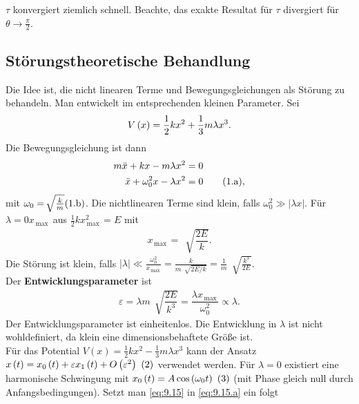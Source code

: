 \documentclass[a4paper,12pt]{article}
\newcommand\inlineeqno{\stepcounter{equation}\ {(\theequation)}}
\newcommand\inlineeqnob{(\theequation.\text{b})}
\newcommand\inlineeqnowoa{\theequation.\text{a}}
\numberwithin{equation}{section}
\begin{document}
$\tau $ konvergiert ziemlich schnell. Beachte, das exakte Resultat für $\tau $ divergiert für $\theta \rightarrow \tfrac{\pi }{2}$.

\subsection{Störungstheoretische Behandlung}
Die Idee ist, die nicht linearen Terme und Bewegungsgleichungen als Störung zu behandeln. Man entwickelt im entsprechenden kleinen Parameter. Sei
\begin{align} 
        V\left(x\right)=\dfrac{1}{2}kx^2+\dfrac{1}{3}m\lambda x^3\stepcounter{equation}\label{eq:9.15}
.\end{align} 
Die Bewegungsgleichung ist dann
\begin{align} 
        m\ddot{x}+kx-m\lambda x^2&=0\nonumber \\
        \ddot{x}+\omega _0^2x-\lambda x^2&=0\tag{\inlineeqnowoa}\label{eq:9.15.a}
,\end{align} 
mit $\omega _0=\,\sqrt[]{\tfrac{k}{m}}\inlineeqnob\label{eq:9.15.b}$.
Die nichtlinearen Terme sind klein, falls $\omega _0^2\gg |\lambda x|$. Für $\lambda =0x_{\,\text{max}\,}$ aus $\tfrac{1}{2}kx_{\,\text{max}\,}^2=E$ mit
\begin{align} 
        x_{\,\text{max}\,}=\,\sqrt[]{\dfrac{2E}{k}}\label{eq:9.16}
.\end{align} 
Die Störung ist klein, falls $|\lambda |\ll \tfrac{\omega _0^2}{x_{\,\text{max}\,}}=\tfrac{k}{m\,\sqrt[]{2E/k}}=\tfrac{1}{m}\,\sqrt[]{\tfrac{k^3}{2E}}$.\\\indent
Der \textbf{Entwicklungsparameter} ist
\begin{align} 
        \varepsilon =\lambda m\,\sqrt[]{\dfrac{2E}{k^3}}=\dfrac{\lambda x_{\,\text{max}\,}}{\omega _0^2}\propto \lambda \label{eq:9.17}
.\end{align} 
Der Entwicklungsparameter ist einheitenlos. Die Entwicklung in $\lambda $ ist nicht wohldefiniert, da \glqq klein\grqq{} eine dimensionsbehaftete Größe ist.\\\indent
Für das Potential $V\left(x\right)=\tfrac{1}{2}kx^2-\tfrac{1}{3}m\lambda x^3$ kann der Ansatz $x\left(t\right)=x_0\left(t\right)+\varepsilon x_1\left(t\right)+O\left(\varepsilon ^2\right)\inlineeqno\label{eq:9.18}$ verwendet werden. Für $\lambda =0$ existiert eine harmonische Schwingung mit $x_0\left(t\right)=A\cos \left(\omega _0t\right)\inlineeqno\label{eq:9.19}$ (mit Phase gleich null durch Anfangsbedingungen). Setzt man \eqref{eq:9.15} in \eqref{eq:9.15.a} ein folgt
\end{document}
